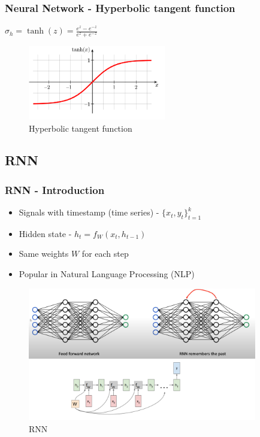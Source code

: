 \documentclass[12pt]{report}
\begin{document}
\subsubsection{Neural Network - Hyperbolic tangent  function}
$\sigma_h = \tanh(z) = \frac{e^z-e^{-z}}{e^z+e^{-z}}$
\begin{figure}[H]\centering\includegraphics[width=6cm]{tanh.png}\caption{Hyperbolic tangent function}\end{figure}



\newpage
\subsection{RNN}

\subsubsection{RNN - Introduction}
\begin{itemize}
	\item Signals with timestamp (time series) - $\{x_t, y_t \}_{t=1}^k$
	\item Hidden state - $h_t = f_{W}(x_t, h_{t-1})$
	\item Same weights $W$ for each step
	\item Popular in Natural Language Processing (NLP)
\end{itemize}
\begin{figure}[H]\centering\includegraphics[width=10cm]{RNN.png}\caption{RNN}\end{figure}
\end{document}
